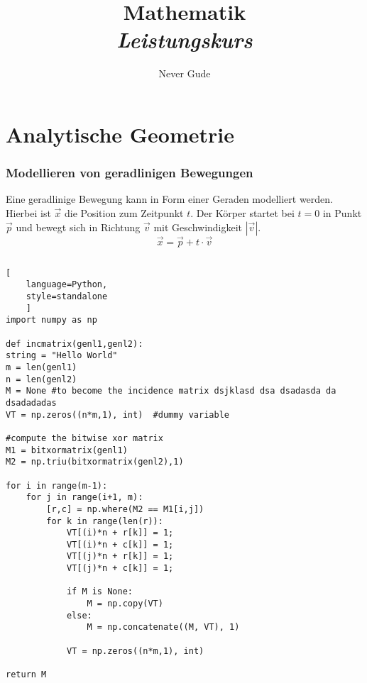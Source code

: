 \documentclass[10pt]{article}
\begin{document}
\title{{Mathematik}\\{\normalsize{\itshape Leistungskurs}}}
\author{Never Gude}
\maketitle
\newpage
\pagestyle{fancynotes}

\part{Analytische Geometrie}
\section{Modellieren von geradlinigen Bewegungen}
\begin{definition}
	Eine geradlinige Bewegung kann in Form einer Geraden modelliert werden.\\
	Hierbei ist $\vec{x}$ die Position zum Zeitpunkt $t$. Der Körper startet bei $t=0$ in Punkt $\vec{p}$ und bewegt sich in Richtung $\vec{v}$ mit Geschwindigkeit $|\vec{v}|$.
	\[
	\vec{x} = \vec{p} + t \cdot \vec{v}
	\]
\end{definition}

\begin{example}
\[
\]
\end{example}

\begin{lstlisting}[
	language=Python,
	style=standalone
	]
import numpy as np

def incmatrix(genl1,genl2):
string = "Hello World"
m = len(genl1)
n = len(genl2)
M = None #to become the incidence matrix dsjklasd dsa dsadasda da dsadadadas
VT = np.zeros((n*m,1), int)  #dummy variable

#compute the bitwise xor matrix
M1 = bitxormatrix(genl1)
M2 = np.triu(bitxormatrix(genl2),1)

for i in range(m-1):
	for j in range(i+1, m):
		[r,c] = np.where(M2 == M1[i,j])
		for k in range(len(r)):
			VT[(i)*n + r[k]] = 1;
			VT[(i)*n + c[k]] = 1;
			VT[(j)*n + r[k]] = 1;
			VT[(j)*n + c[k]] = 1;

			if M is None:
				M = np.copy(VT)
			else:
				M = np.concatenate((M, VT), 1)

			VT = np.zeros((n*m,1), int)

return M

\end{lstlisting}
\end{document}
